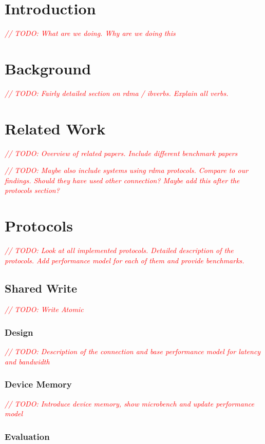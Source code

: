 \documentclass{article}
\newcommand{\todo}[1]{\textit{\textcolor{red}{// TODO: #1} }}
\theoremstyle{plain}
\theoremstyle{definition}
\theoremstyle{remark}
\begin{document}
\iffalse
\fi


\tableofcontents
\pagebreak
\section{Introduction}
\todo{What are we doing. Why are we doing this}

\pagebreak
\section{Background}
\todo{Fairly detailed section on rdma / ibverbs. Explain all verbs.}


\pagebreak
\section{Related Work}

\todo{Overview of related papers. Include different benchmark papers}

\todo{Maybe also include systems using rdma protocols. Compare to our findings. Should they have used other connection? 
Maybe add this after the protocols section?}

\pagebreak


\pagebreak
\section{Protocols}
\todo{Look at all implemented protocols. Detailed description of the protocols. Add performance model for each of them and provide benchmarks.}

\pagebreak


\pagebreak


\pagebreak
\subsection{Shared Write}
\todo{Write Atomic}
\subsubsection{Design}
\todo{Description of the connection and base performance model for latency and bandwidth}
\subsubsection{Device Memory}
\todo{Introduce device memory, show microbench and update performance model}
\subsubsection{Evaluation}
\end{document}
